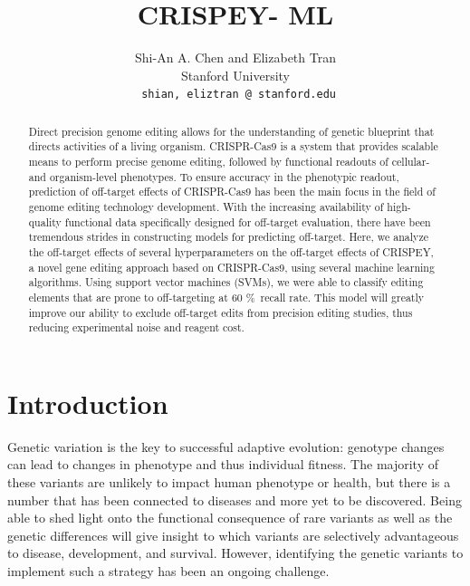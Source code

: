 \documentclass[10pt,twocolumn,letterpaper]{article}
\begin{document}
\title{CRISPEY- ML}

\author{Shi-An  A. Chen and Elizabeth Tran \\
Stanford University\\
{\tt\small { shian, eliztran @ stanford.edu}}\\
}
\maketitle

\begin{abstract}
Direct precision genome editing allows for the understanding of genetic blueprint that directs activities of a living organism. CRISPR-Cas9 is a system that provides scalable means to perform precise genome editing, followed by functional readouts of cellular-and organism-level phenotypes. To ensure accuracy in the phenotypic readout, prediction of off-target effects of CRISPR-Cas9 has been the main focus in the field of genome editing technology development.
With the increasing availability of high-quality functional data specifically designed for off-target evaluation, there have been tremendous strides in constructing models for predicting off-target. Here, we analyze the off-target effects of several hyperparameters on the off-target effects of CRISPEY, a novel gene editing approach based on CRISPR-Cas9, using several machine learning algorithms. Using support vector machines (SVMs), we were able to classify editing elements that are prone to off-targeting at 60 \%\ recall rate. This model will greatly improve our ability to exclude off-target edits from precision editing studies, thus reducing experimental noise and reagent cost.
\end{abstract}


\section*{Introduction}
Genetic variation is the key to successful adaptive evolution: genotype changes can lead to changes in phenotype and thus individual fitness. The majority of these variants are unlikely to impact human phenotype or health, but there is a number that has been connected to diseases and more yet to be discovered. Being able to shed light onto the functional consequence of rare variants as well as the genetic differences will give insight to which variants are selectively advantageous to disease, development, and survival. However, identifying the genetic variants to implement such a strategy has been an ongoing challenge.
\end{document}
